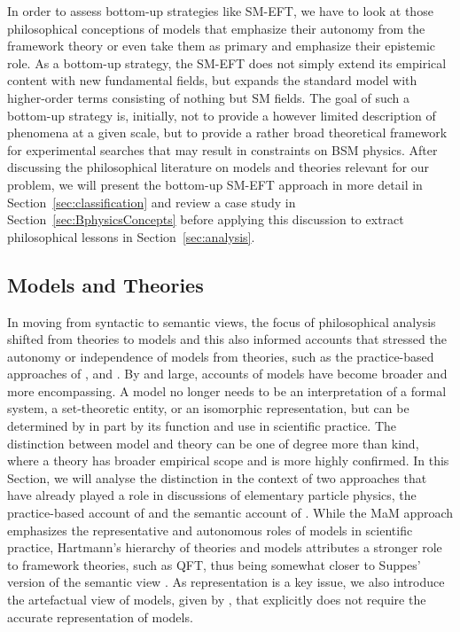 In order to assess bottom-up strategies like SM-EFT, we have to look at those philosophical conceptions of models that emphasize their autonomy from the framework theory or even take them as primary and emphasize their epistemic role. 
As a bottom-up strategy, the SM-EFT does not simply extend its empirical content with new fundamental fields, but expands the standard model with higher-order terms consisting of nothing but SM fields.
The goal of such a bottom-up strategy is, initially, not to provide a however limited description of phenomena at a given scale, but to provide a rather broad theoretical framework for experimental searches that may result in constraints on BSM physics.
After discussing the philosophical literature on models and theories relevant for our problem, we will present the bottom-up SM-EFT approach in more detail in Section~\ref{sec:classification} and review a case study in Section~\ref{sec:BphysicsConcepts} before applying this discussion to extract philosophical lessons in Section~\ref{sec:analysis}.

\subsection{Models and Theories}
\label{sub:modeltheory}

In moving from syntactic to semantic views, the focus of philosophical analysis shifted from theories to models and this also informed accounts that stressed the autonomy or independence of models from theories, such as the practice-based approaches of \citet{cartwright99}, and \citet{morganmorrison}.
By and large, accounts of models have become broader and more encompassing.
A model no longer needs to be an interpretation of a formal system, a set-theoretic entity, or an isomorphic representation, but can be determined by in part by its function and use in scientific practice.
The distinction between model and theory can be one of degree more than kind, where a theory has broader empirical scope and is more highly confirmed. 
In this Section, we will analyse the distinction in the context of two approaches that have already played a role in discussions of elementary particle physics, the practice-based account of \citet{morganmorrison} and the semantic account of \citet{hartmann1998}. 
While the MaM approach emphasizes the representative and autonomous roles of models in scientific practice, Hartmann's  hierarchy of theories and models attributes a stronger role to framework theories, such as QFT, thus being somewhat closer to Suppes' version of the semantic view \citep{suppes1962}. 
As representation is a key issue, we also introduce the artefactual view of models, given by \citet{knuuttila2011,Knuuttila2017}, that explicitly does not require the accurate representation of models. 


